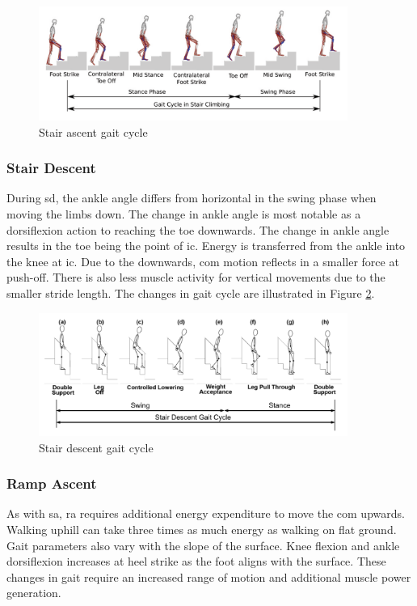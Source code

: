 \begin{figure}[!hbt]
    \centering
    \includegraphics[width=0.9\textwidth]{content/2-Background/sa_gait_cycle.pdf}
    \caption[Stair ascent gait cycle]{Stair ascent gait cycle\cite{Cheung2020}}
    \label{fig:stair-ascent-gait-cycle}
\end{figure}

\subsubsection{Stair Descent}
During \acrshort{sd}, the ankle angle differs from horizontal in the swing phase when moving the limbs down. The change in ankle angle is most notable as a dorsiflexion action to reaching the toe downwards. The change in ankle angle results in the toe being the point of \acrshort{ic}. Energy is transferred from the ankle into the knee at \acrshort{ic}. Due to the downwards, \acrshort{com} motion reflects in a smaller force at push-off. There is also less muscle activity for vertical movements due to the smaller stride length.\cite{Svensson2007} The changes in gait cycle are illustrated in Figure \ref{fig:stair-descent-gait-cycle}.

\begin{figure}[!hbt]
    \centering
    \includegraphics[width=0.9\textwidth]{content/2-Background/sd_gait_cycle.pdf}
    \caption[Stair descent gait cycle]{Stair descent gait cycle\cite{Bulea2014}}
    \label{fig:stair-descent-gait-cycle}
\end{figure}

\subsubsection{Ramp Ascent}
As with \acrshort{sa}, \acrshort{ra} requires additional energy expenditure to move the \acrshort{com} upwards\cite{Franz2012a}. Walking uphill can take three times as much energy as walking on flat ground\cite{Matsumoto2017}. Gait parameters also vary with the slope of the surface\cite{Kimel-Naor2017}. Knee flexion and ankle dorsiflexion increases at heel strike as the foot aligns with the surface. These changes in gait require an increased range of motion and additional muscle power generation.\cite{McIntosh2006}

